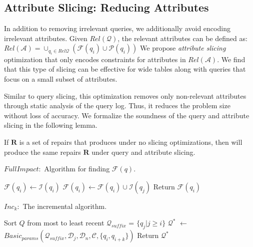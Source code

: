 \subsection{Attribute Slicing: Reducing Attributes}\label{sec:opt:attslice}

In addition to removing irrelevant queries, we additionally avoid encoding irrelevant attributes.
Given $Rel\mathcal{(Q)}$, the relevant attributes can be defined as:
$Rel\mathcal{(A)} = \cup_{q_i \in Rel\mathcal{Q}} (\mathcal{F}(q_i)\cup \mathcal{P}(q_i))$
We propose \emph{attribute slicing} optimization that only encodes constraints for attributes in $Rel\mathcal{(A)}$.
We find that this type of slicing can be effective for wide tables along with queries that focus on a small subset of attributes.  

Similar to query slicing, this optimization removes only non-relevant
attributes through static analysis of the query log. Thus, it reduces the problem
size without loss of accuracy. We formalize the soundness of the query and
attribute slicing in the following lemma.
% 
\begin{lemma}\label{lem:sound}
    If $\mathbf{R}$ is a set of repairs that \sys produces under no slicing
    optimizations, then \sys will produce the same repairs $\mathbf{R}$ under
    query and attribute slicing.
\end{lemma}


\begin{algorithm}[t]
\scriptsize
\caption{$FullImpact:$ Algorithm for finding $\mathcal{F}(q)$.}
\label{alg:fullimpact}
\begin{algorithmic}[2]
\STATE $\mathcal{F}(q_i) \leftarrow \mathcal{I}(q_i)$
\STATE $\mathcal{F}(q_i) \leftarrow \mathcal{F}(q_i) \cup \mathcal{I}(q_j)$
\ENDIF
\ENDFOR
\STATE Return $\mathcal{F}(q_i)$
\end{algorithmic}
\end{algorithm}

\begin{algorithm}[t]
\caption{$Inc_k:$ The incremental algorithm. 
}
\scriptsize
\label{alg:incalg}
\begin{algorithmic}[2]
\STATE Sort $Q$ from most to least recent
  \STATE $\mathcal{Q}_{suffix}$ = $\{q_j | j \ge i \}$ 
  \STATE $\mathcal{Q}^*$ $\leftarrow$ $Basic_{params}(\mathcal{Q}_{suffix}, \mathcal{D}_j, \mathcal{D}_n, \mathcal{C}, \{q_i, q_{i+k}\})$
    \STATE Return $\mathcal{Q}^*$
  \ENDIF
\ENDFOR
\end{algorithmic}
\end{algorithm}

